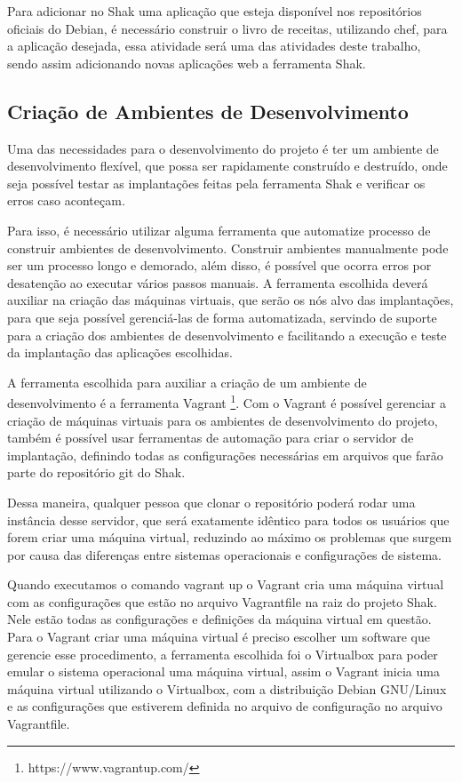Para adicionar no Shak uma aplicação que esteja disponível nos repositórios oficiais
do Debian, é necessário construir o livro de receitas, utilizando chef, para a
aplicação desejada, essa atividade será uma das atividades deste trabalho, sendo assim
adicionando novas aplicações web a ferramenta Shak.

\subsection{Criação de Ambientes de Desenvolvimento}

Uma das necessidades para o desenvolvimento do projeto é ter um ambiente de desenvolvimento
flexível, que possa ser rapidamente construído e destruído, onde seja possível 
testar as implantações feitas pela ferramenta Shak e verificar os erros caso 
aconteçam. 

Para isso, é necessário utilizar alguma ferramenta que automatize processo de 
construir ambientes de desenvolvimento. Construir ambientes manualmente pode
ser um processo longo e demorado, além disso, é possível que ocorra erros por
desatenção ao executar vários passos manuais. A ferramenta escolhida deverá auxiliar
 na criação das máquinas virtuais, que serão os nós alvo 
das implantações, para que seja possível gerenciá-las de forma automatizada, 
servindo de suporte para a criação dos ambientes de desenvolvimento e 
facilitando a execução e teste da implantação das aplicações escolhidas.

A ferramenta escolhida para auxiliar a criação de um ambiente de desenvolvimento é
a ferramenta Vagrant \footnote{https://www.vagrantup.com/}. Com o Vagrant é 
possível gerenciar a criação de máquinas
virtuais para os ambientes de desenvolvimento do projeto, também é possível usar
ferramentas de automação para criar o servidor de implantação, definindo todas
as configurações necessárias em arquivos que farão parte do repositório git do 
Shak. 

Dessa maneira, qualquer pessoa que clonar o repositório poderá rodar uma 
instância desse servidor, que será exatamente idêntico para todos os usuários 
que forem criar uma máquina virtual, reduzindo ao máximo os problemas que surgem 
por causa das diferenças entre sistemas operacionais e configurações de sistema.

Quando executamos o comando vagrant up o Vagrant cria uma máquina virtual com as
configurações que estão no arquivo Vagrantfile na raiz do projeto Shak. Nele
estão todas as configurações e definições da máquina virtual em questão. Para o
Vagrant criar uma máquina virtual é preciso escolher um software que gerencie
esse procedimento, a ferramenta escolhida foi o Virtualbox para poder emular o sistema
operacional uma máquina virtual, assim o Vagrant inicia uma máquina virtual
utilizando o Virtualbox, com a distribuição Debian GNU/Linux e as configurações que estiverem
definida no arquivo de configuração no arquivo Vagrantfile.


